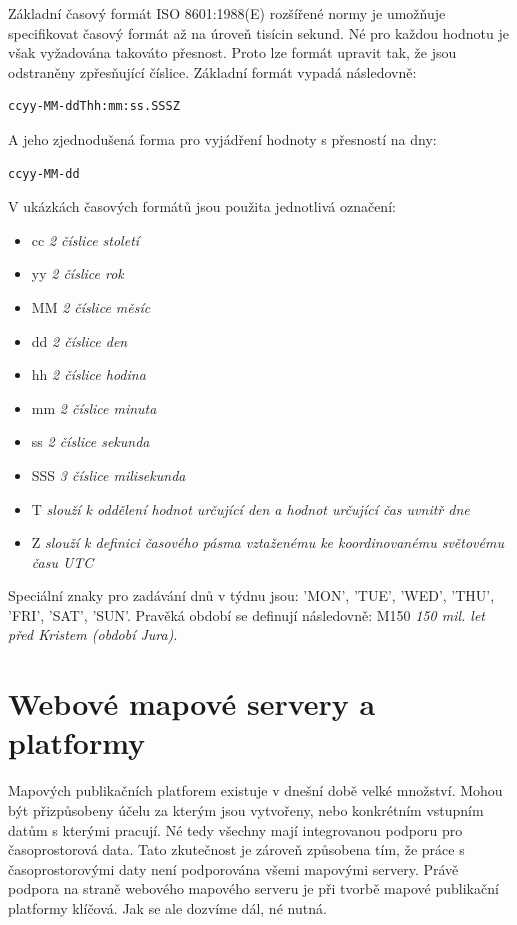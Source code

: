 Základní časový formát ISO 8601:1988(E) rozšířené normy je umožňuje specifikovat časový formát až na úroveň tisícin sekund. Né pro každou hodnotu je však vyžadována takováto přesnost. Proto lze formát upravit tak, že jsou odstraněny zpřesňující číslice. Základní formát vypadá následovně:

\begin{verbatim}
ccyy-MM-ddThh:mm:ss.SSSZ
\end{verbatim}

\noindent
A jeho zjednodušená forma pro vyjádření hodnoty s přesností na dny:

\begin{verbatim}
ccyy-MM-dd
\end{verbatim}

\noindent
V ukázkách časových formátů jsou použita jednotlivá označení:

\begin{itemize}
	\item cc \textit{2 číslice století}
	\item yy \textit{2 číslice rok}
	\item MM \textit{2 číslice měsíc}
	\item dd \textit{2 číslice den}
	\item hh \textit{2 číslice hodina}
	\item mm \textit{2 číslice minuta}
	\item ss \textit{2 číslice sekunda}
	\item SSS \textit{3 číslice milisekunda}
\end{itemize}

\begin{itemize}
	\item T \textit{slouží k oddělení hodnot určující den a hodnot určující čas uvnitř dne}
	\item Z \textit{slouží k definici časového pásma vztaženému ke koordinovanému světovému času UTC}
\end{itemize}

Speciální znaky pro zadávání dnů v týdnu jsou: 'MON', 'TUE', 'WED', 'THU', 'FRI', 'SAT', 'SUN'. Pravěká období se definují následovně: M150 \textit{150 mil. let před Kristem (období Jura)}.

\newpage
\section{Webové mapové servery a platformy}

 Mapových publikačních platforem existuje v dnešní době velké množství. Mohou být přizpůsobeny účelu za kterým jsou vytvořeny, nebo konkrétním vstupním datům s kterými pracují. Né tedy všechny mají integrovanou podporu pro časoprostorová data. Tato zkutečnost je zároveň způsobena tím, že práce s časoprostorovými daty není podporována všemi mapovými servery. Právě podpora na straně webového mapového serveru je při tvorbě mapové publikační platformy klíčová. Jak se ale dozvíme dál, né nutná.
 
